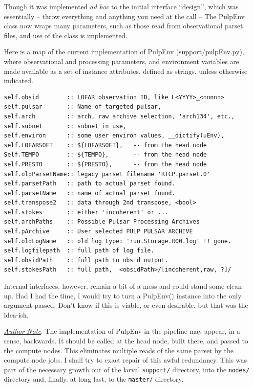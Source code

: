 \documentclass[a4paper,10pt,bibtotoc]{scrartcl}
\begin{document}
Though it was implemented \textit{ad hoc} to the initial interface ``design'', 
which was essentially -- throw everything and anything you need at the call -- 
The PulpEnv class now wraps many parameters, such as those read from 
observational parset files, and use of the class is implemented.

Here is a map of the current implementation of PulpEnv (support/pulpEnv.py),
where observational and processing parameters, and environment variables are
made available as a set of instance attributes, defined as strings, unless
otherwise indicated.

\begin{verbatim}self.obsid        :: LOFAR observation ID, like L<YYYY>_<nnnnn>
self.pulsar       :: Name of targeted pulsar,
self.arch         :: arch, raw archive selection, 'arch134', etc.,
self.subnet       :: subnet in use,
self.environ      :: some user environ values, __dictify(uEnv),    
self.LOFARSOFT    :: ${LOFARSOFT},   -- from the head node
Self.TEMPO        :: ${TEMPO},       -- from the head node
self.PRESTO       :: ${PRESTO},      -- from the head node
self.oldParsetName:: legacy parset filename 'RTCP.parset.0'
self.parsetPath   :: path to actual parset found.
self.parsetName   :: name of actual parset found.
self.transpose2   :: data through 2nd transpose, <bool>
self.stokes       :: either 'incoherent' or ...
self.archPaths    :: Possible Pulsar Processing Archives
self.pArchive     :: User selected PULP PULSAR ARCHIVE
self.oldLogName   :: old log type: 'run.Storage.R00.log' !! gone.
self.logfilepath  :: full path of log file.
self.obsidPath    :: full path to obsid output.
self.stokesPath   :: full path,  <obsidPath>/[incoherent,raw, ?]/
\end{verbatim}

Internal interfaces, however, remain a bit of a mess and could stand some 
clean up.  Had I had the time, I would try to turn a PulpEnv() instance into 
the only argument passed.  Don't know if this is viable, or even desirable,
but that was the idea-ish.  

\underline{\em{Author Note}}: The implementation of PulpEnv in the pipeline may appear, 
in a sense, backwards.  It should be called at the head node, built there, and passed 
to the compute nodes.  This eliminates multiple reads of the same parset by the compute node jobs. I shall try to exact repair of this awful redundancy.  This was part of the necessary growth out of the larval \verb|support/| directory, into the \verb|nodes/| directory and, finally, at long last, to the \verb|master/| directory.
\end{document}
